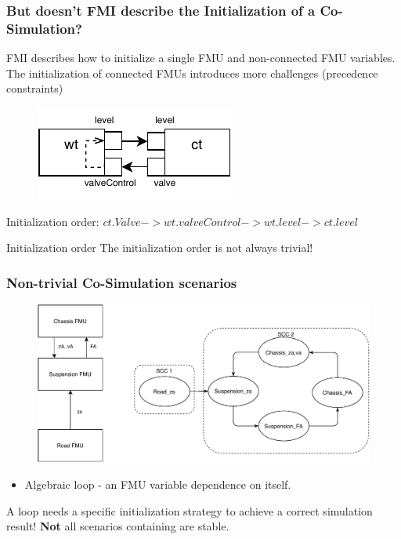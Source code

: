 \documentclass{beamer}
\begin{document}
\begin{frame}
\frametitle{But doesn't FMI describe the Initialization of a Co-Simulation?}
FMI describes how to initialize a single FMU and non-connected FMU variables.
The initialization of connected FMUs introduces more challenges (precedence constraints)

\begin{figure}
    \centering
    \includegraphics[scale=1.5]{images/ExpansionPlugin-Page-3.pdf}
\end{figure}
Initialization order: $ct.Valve -> wt.valveControl -> wt.level -> ct.level$
\begin{alertblock}{Initialization order} 
    The initialization order is not always trivial! 
\end{alertblock}
\end{frame}

\begin{frame}
\frametitle{Non-trivial Co-Simulation scenarios}
\begin{figure}
    \centering
    \includegraphics[scale=0.6]{images/quarter_car_SCC.pdf}
    \label{fig:SCC_quarter}
\end{figure}
\begin{itemize}
    \item Algebraic loop - an FMU variable dependence on itself.
\end{itemize}
A loop needs a specific initialization strategy to achieve a correct simulation result!
\textbf{Not} all scenarios containing are stable.
\end{frame}
\end{document}
